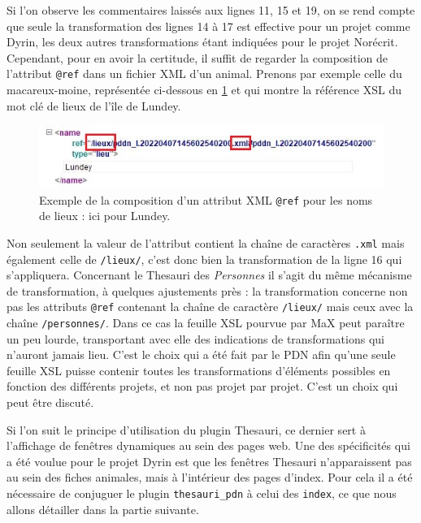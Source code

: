 \documentclass[a4paper,12pt,twoside]{book}
\begin{document}
Si l'on observe les commentaires laissés aux lignes 11, 15 et 19, on se rend compte que seule la transformation des lignes 14 à 17 est effective pour un projet comme Dyrin, les deux autres transformations étant indiquées pour le projet Norécrit. Cependant, pour en avoir la certitude, il suffit de regarder la composition de l'attribut \texttt{@ref} dans un fichier XML d'un animal. Prenons par exemple celle du macareux-moine, représentée ci-dessous en \ref{macareux} et qui montre la référence \acrshort{XSL} du mot clé de lieux de l'île de Lundey.

\begin{figure}[H]
    \centering
    \includegraphics[width=12cm]{img/partie_3/lundey_xml.JPG}
    \caption{Exemple de la composition d'un attribut XML \texttt{@ref} pour les noms de lieux : ici pour Lundey.}
    \label{macareux}
\end{figure}
Non seulement la valeur de l'attribut contient la chaîne de caractères \texttt{.xml} mais également celle de \texttt{/lieux/}, c'est donc bien la transformation de la ligne 16 qui s'appliquera. Concernant le Thesauri des \textit{Personnes} il s'agit du même mécanisme de transformation, à quelques ajustements près : la transformation concerne non pas les attributs \texttt{@ref} contenant la chaîne de caractère \texttt{/lieux/} mais ceux avec la chaîne \texttt{/personnes/}. Dans ce cas la feuille \acrshort{XSL} pourvue par MaX peut paraître un peu lourde, transportant avec elle des indications de transformations qui n'auront jamais lieu. C'est le choix qui a été fait par le \acrshort{PDN} afin qu'une seule feuille \acrshort{XSL} puisse contenir toutes les transformations d'éléments possibles en fonction des différents projets, et non pas projet par projet. C'est un choix qui peut être discuté.

Si l'on suit le principe d'utilisation du plugin Thesauri, ce dernier sert à l'affichage de fenêtres dynamiques au sein des pages web. Une des spécificités qui a été voulue pour le projet Dyrin est que les fenêtres Thesauri n'apparaissent pas au sein des fiches animales, mais à l'intérieur des pages d'index. Pour cela il a été nécessaire de conjuguer le plugin \texttt{thesauri\_pdn} à celui des \texttt{index}, ce que nous allons détailler dans la partie suivante.
\end{document}
